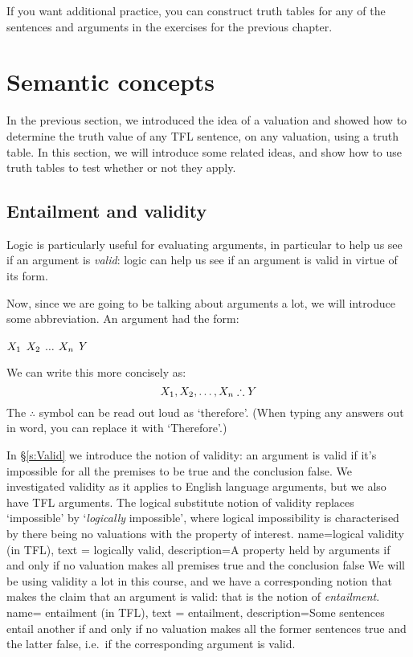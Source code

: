 If you want additional practice, you can construct truth tables for any of the sentences and arguments in the exercises for the previous chapter.


\chapter{Semantic concepts}
\label{s:SemanticConcepts}

In the previous section, we introduced the idea of a valuation and showed how to determine the truth value of any TFL sentence, on any valuation, using a truth table. In this section, we will introduce some related ideas, and show how to use truth tables to test whether or not they apply.

\section{Entailment and validity}
Logic is particularly useful for evaluating arguments, in particular to help us see if an argument is \emph{valid}: logic can help us see if an argument is valid in virtue of its form. 

Now, since we are going to be talking about arguments a lot, we will introduce some abbreviation. An argument had the form:
\begin{earg}
\prem $X_1$
\prem $X_2$
\prem $\ldots$
\prem $X_n$
\conc $Y$
\end{earg}
We can write this more concisely as: $$\metaX_1, \metaX_2, \ldots, \metaX_n\therefore \metaY$$ The $\therefore$ symbol can be read out loud as `therefore'. (When typing any answers out in word, you can replace it with `Therefore'.)

In \S\ref{s:Valid} we introduce the notion of validity: an argument is valid if it's impossible for all the premises to be true and the conclusion false. We investigated validity as it applies to English language arguments, but we also have TFL arguments. The logical substitute notion of validity replaces `impossible' by `\emph{logically} impossible', where logical impossibility is characterised by there being no valuations with the property of interest.
{
	name=logical validity (in TFL),
	text = logically valid,
	description={A property held by arguments if and only if no \gls{valuation} makes all premises true and the conclusion false}
}
We will be using validity a lot in this course, and we have a corresponding notion that makes the claim that an argument is valid: that is the notion of \emph{entailment}.
{
	name= entailment (in TFL),
	text = entailment,
	description={Some sentences entail another if and only if no \gls{valuation} makes all the former sentences true and the latter false, i.e.~if the corresponding argument is valid.}
}

